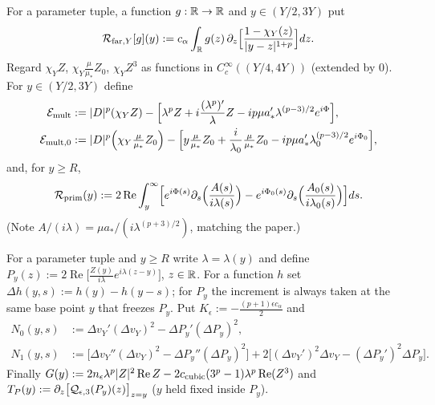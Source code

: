 \begin{definition}
  \label{def:c05_auxiliary_remainders}
  For a parameter tuple, a function $g:\mathbb{R}\to\mathbb{R}$ and $y\in(Y/2,3Y)$ put
  \begin{equation}\label{eqn:approx_E5_far_remainder}
    \mathcal{R}_{\textup{far},Y}[g](y):=c_\alpha\int_{\mathbb{R}} g(z)\,\partial_z\Bigl[\frac{1-\chi_Y(z)}{|y-z|^{1+p}}\Bigr]dz.
  \end{equation}
  Regard $\chi_YZ$, $\chi_Y\frac{\mu}{\mu_*}Z_0$, $\chi_YZ^3$ as functions in $C_c^\infty((Y/4,4Y))$
  (extended by $0$). For $y\in(Y/2,3Y)$ define
  \begin{align*}
    \mathcal{E}_{\textup{mult}}&:=|D|^p(\chi_YZ)-\Bigl[\lambda^pZ+i\frac{(\lambda^p)'}{\lambda}Z-ip\mu a_*'\lambda^{(p-3)/2}e^{i\Phi}\Bigr],\\
    \mathcal{E}_{\textup{mult},0}&:=|D|^p\Bigl(\chi_Y\tfrac{\mu}{\mu_*}Z_0\Bigr)-\Bigl[y\tfrac{\mu}{\mu_*}Z_0+\frac{i}{\lambda_0}\tfrac{\mu}{\mu_*}Z_0-ip\mu a_*'\lambda_0^{(p-3)/2}e^{i\Phi_0}\Bigr],
  \end{align*}
  and, for $y\ge R$,
  \begin{equation}\label{eqn:approx_E5_primitive_remainder}
    \mathcal{R}_{\textup{prim}}(y):=2\operatorname{Re}\int_y^\infty\Bigl[e^{i\Phi(s)}\partial_s\Bigl(\frac{A(s)}{i\lambda(s)}\Bigr)
    -e^{i\Phi_0(s)}\partial_s\Bigl(\frac{A_0(s)}{i\lambda_0(s)}\Bigr)\Bigr]ds .
  \end{equation}
  (Note $A/(i\lambda)=\mu a_*/(i\lambda^{(p+3)/2})$, matching the paper.)
\end{definition}

\begin{definition}
  \label{def:c05_plane_wave}
  For a parameter tuple and $y\ge R$ write $\lambda=\lambda(y)$ and define
  $P_y(z):=2\operatorname{Re}\bigl[\frac{Z(y)}{i\lambda}e^{i\lambda(z-y)}\bigr]$, $z\in\mathbb{R}$.
  For a function $h$ set $\Delta h(y,s):=h(y)-h(y-s)$; for $P_y$ the increment is always taken at the
  same base point $y$ that freezes $P_y$. Put $K_\epsilon:=-\frac{(p+1)\epsilon c_\alpha}{2}$ and
  \begin{align*}
    N_0(y,s)&:=\Delta v_Y'(\Delta v_Y)^2-\Delta P_y'(\Delta P_y)^2,\\
    N_1(y,s)&:=\bigl[\Delta v_Y''(\Delta v_Y)^2-\Delta P_y''(\Delta P_y)^2\bigr]
    +2\bigl[(\Delta v_Y')^2\Delta v_Y-(\Delta P_y')^2\Delta P_y\bigr].
  \end{align*}
  Finally $G(y):=2n_\epsilon\lambda^p|Z|^2\operatorname{Re}Z-2c_{\textup{cubic}}(3^p-1)\lambda^p\operatorname{Re}(Z^3)$ and
  $T_P(y):=\partial_z\bigl[\mathcal{Q}_{\epsilon,3}(P_y)(z)\bigr]_{z=y}$ ($y$ held fixed inside $P_y$).
\end{definition}

